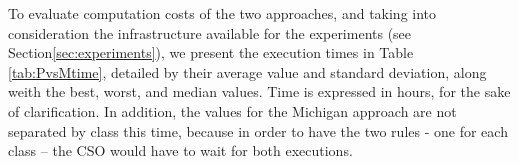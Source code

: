 \documentclass[runningheads]{llncs}
\begin{document}
To evaluate computation costs of the two approaches, and taking into consideration the infrastructure available for the experiments (see Section\ref{sec:experiments}), we present the execution times in Table \ref{tab:PvsMtime}, detailed by their average value and standard deviation, along weith the best, worst, and median values. Time is expressed in hours, for the sake of clarification. In addition, the values for the Michigan approach are not separated by class this time, because in order to have the two rules - one for each class -- the CSO would have to wait for both executions.
%
\begin{table}[h!tbp]
	\centering
	\caption{Execution time, Pittsburgh and Michigan approaches;
          this one adds times for GRANTED and STRONGDENY. \textbf{$*$} marks  statistically significant best values.}
\end{table}
\end{document}
